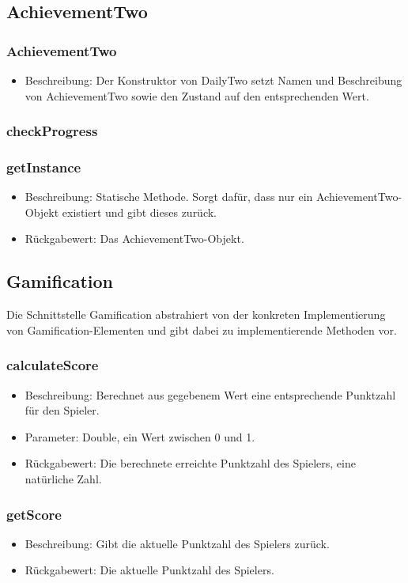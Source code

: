 \documentclass[a4paper]{scrreprt}
\begin{document}
	\subsection{AchievementTwo}
	\subsubsection{AchievementTwo}
	\begin{itemize}
		\item Beschreibung: Der Konstruktor von DailyTwo setzt Namen und Beschreibung von AchievementTwo sowie den Zustand auf den entsprechenden Wert.
	\end{itemize}
	\subsubsection{checkProgress}
	\subsubsection{getInstance}
	\begin{itemize}
		\item Beschreibung: Statische Methode. Sorgt dafür, dass nur ein AchievementTwo-Objekt existiert und gibt dieses zurück.
		\item Rückgabewert: Das AchievementTwo-Objekt.
	\end{itemize}
	
	
	\subsection{Gamification}
	Die Schnittstelle Gamification abstrahiert von der konkreten Implementierung von Gamification-Elementen und gibt dabei zu implementierende Methoden vor.
	\subsubsection{calculateScore}
	\begin{itemize}
		\item Beschreibung: Berechnet aus gegebenem Wert eine entsprechende Punktzahl für den Spieler.
		\item Parameter: Double, ein Wert zwischen 0 und 1. 
		\item Rückgabewert: Die berechnete erreichte Punktzahl des Spielers, eine natürliche Zahl.
	\end{itemize}
	\subsubsection{getScore}
	\begin{itemize}
		\item Beschreibung: Gibt die aktuelle Punktzahl des Spielers zurück.
		\item Rückgabewert: Die aktuelle Punktzahl des Spielers.
	\end{itemize}
\end{document}
